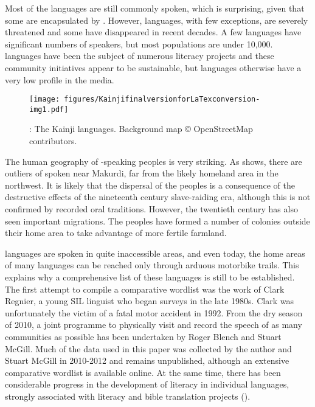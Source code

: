\documentclass[output=paper]{langsci/langscibook}
\begin{document}
Most of the  languages are still commonly spoken, which is surprising, given that some are encapsulated by  \citep{McGillBlench2012}. However,  languages, with few exceptions, are severely threatened and some have disappeared in recent decades. A few  languages have significant numbers of speakers, but most populations are under 10,000.  languages have been the subject of numerous literacy projects and these community initiatives appear to be sustainable, but  languages otherwise have a very low profile in the media.

\begin{figure}
\texttt{[image: figures/KainjifinalversionforLaTexconversion-img1.pdf]} 
\caption{\label{fig:kainji:1}: The Kainji languages. \qquad \tiny Background map © OpenStreetMap contributors.}
\end{figure}



The human geography of -speaking peoples is very striking. As  shows, there are outliers of  spoken near Makurdi, far from the likely homeland area in the northwest. It is likely that the dispersal of the  peoples is a consequence of the destructive effects of the nineteenth century slave-raiding era, although this is not confirmed by recorded oral traditions. However, the twentieth century has also seen important migrations. The  peoples have formed a number of colonies outside their home area to take advantage of more fertile farmland.

 languages are spoken in quite inaccessible areas, and even today, the home areas of many languages can be reached only through arduous motorbike trails. This explains why a comprehensive list of these languages is still to be established. The first attempt to compile a comparative  wordlist was the work of Clark Regnier, a young SIL linguist who began surveys in the late 1980s. Clark was unfortunately the victim of a fatal motor accident in 1992. From the dry season of 2010, a joint programme to physically visit and record the speech of as many  communities as possible has been undertaken by Roger Blench and Stuart McGill. Much of the data used in this paper was collected by the author and Stuart McGill in 2010-2012 and remains unpublished, although an extensive comparative wordlist is available online. At the same time, there has been considerable progress in the development of literacy in individual languages, strongly associated with literacy and bible translation projects (\citealt{McGillBlench2012}).
\end{document}
